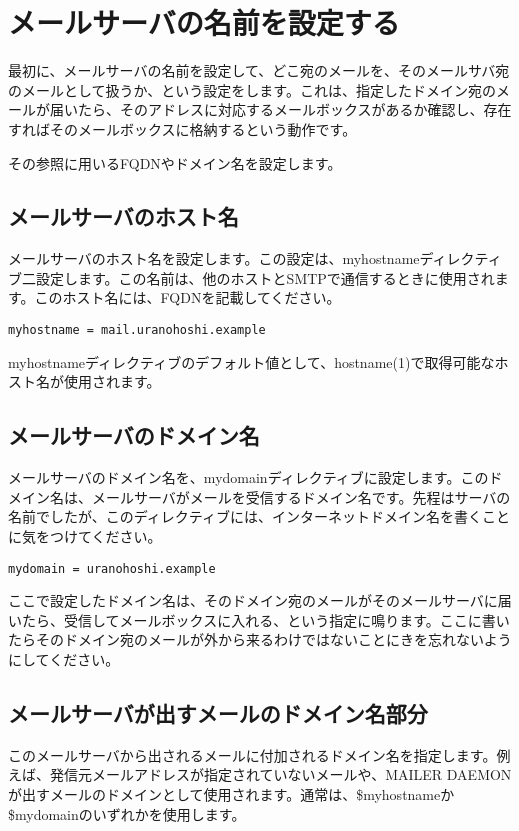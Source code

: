 \section{メールサーバの名前を設定する}
最初に、メールサーバの名前を設定して、どこ宛のメールを、そのメールサバ宛のメールとして扱うか、という設定をします。これは、指定したドメイン宛のメールが届いたら、そのアドレスに対応するメールボックスがあるか確認し、存在すればそのメールボックスに格納するという動作です。

その参照に用いるFQDNやドメイン名を設定します。

\subsection{メールサーバのホスト名}
メールサーバのホスト名を設定します。この設定は、myhostnameディレクティブ二設定します。この名前は、他のホストとSMTPで通信するときに使用されます。このホスト名には、FQDNを記載してください。

\begin{lstlisting}[basicstyle=\ttfamily\footnotesize, frame=single]
myhostname = mail.uranohoshi.example
\end{lstlisting}

myhostnameディレクティブのデフォルト値として、hostname(1)で取得可能なホスト名が使用されます。

\subsection{メールサーバのドメイン名}
メールサーバのドメイン名を、mydomainディレクティブに設定します。このドメイン名は、メールサーバがメールを受信するドメイン名です。先程はサーバの名前でしたが、このディレクティブには、インターネットドメイン名を書くことに気をつけてください。

\begin{lstlisting}[basicstyle=\ttfamily\footnotesize, frame=single]
mydomain = uranohoshi.example
\end{lstlisting}

ここで設定したドメイン名は、そのドメイン宛のメールがそのメールサーバに届いたら、受信してメールボックスに入れる、という指定に鳴ります。ここに書いたらそのドメイン宛のメールが外から来るわけではないことにきを忘れないようにしてください。

\subsection{メールサーバが出すメールのドメイン名部分}
このメールサーバから出されるメールに付加されるドメイン名を指定します。例えば、発信元メールアドレスが指定されていないメールや、MAILER DAEMONが出すメールのドメインとして使用されます。通常は、\$myhostnameか\$mydomainのいずれかを使用します。

